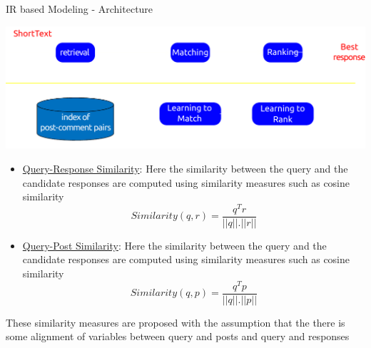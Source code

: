 \begin{frame}{IR based Modeling - Architecture}


\begin{multicols}{2}
	\begin{center}
	\includegraphics[width=0.8\linewidth]{./Images/IR-basedCM}
\end{center}
\begin{itemize}
	\item 	\underline{Query-Response Similarity}:
	Here the similarity between the query and the candidate responses are computed using similarity measures such as cosine similarity
	\begin{equation}
	Similarity(q,r) = \dfrac{q^Tr}{||q||.||r||}
	\end{equation}
	\item 	\underline{Query-Post Similarity}:
	Here the similarity between the query and the candidate responses are computed using similarity measures such as cosine similarity
	\begin{equation}
	Similarity(q,p) = \dfrac{q^Tp}{||q||.||p||}
	\end{equation}

\end{itemize}
These similarity measures are proposed with the assumption that the there is some alignment of variables between query and posts and query and responses

\end{multicols}
\end{frame}

